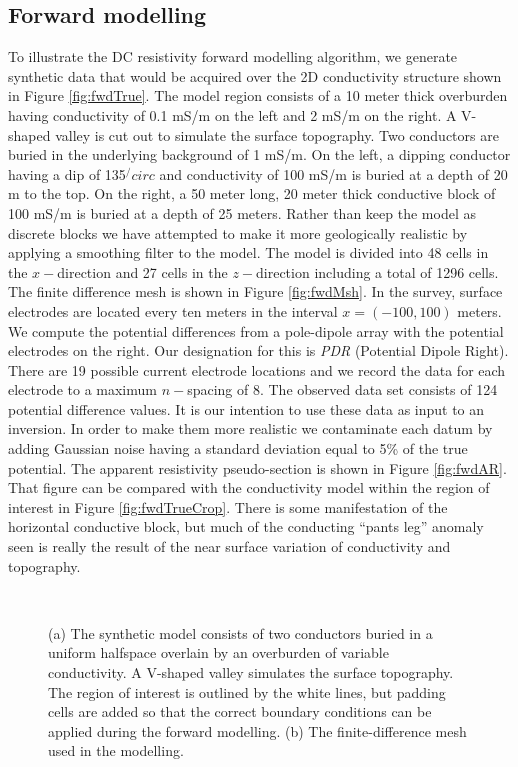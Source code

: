\subsection{Forward modelling}
To illustrate the DC resistivity forward modelling algorithm, we generate synthetic data that would be acquired over the 2D conductivity structure shown in Figure \ref{fig:fwdTrue}. The model region consists of a 10 meter thick overburden having conductivity of 0.1 mS/m on the left and 2 mS/m on the right. A V-shaped valley is cut out to simulate the surface topography. Two conductors are buried in the underlying background of 1 mS/m. On the left, a dipping conductor having a dip of 135$^/circ$ and conductivity of 100 mS/m is buried at a depth of 20 m to the top. On the right, a 50 meter long, 20 meter thick conductive block of 100 mS/m is buried at a depth of 25 meters. Rather than keep the model as discrete blocks we have attempted to make it more geologically realistic by applying a smoothing filter to the model. The model is divided into 48 cells in the $x-$direction and 27 cells in the $z-$direction including a total of 1296 cells. The finite difference mesh is shown in Figure \ref{fig:fwdMsh}. In the survey, surface electrodes are located every ten meters in the interval $x = (-100, 100)$ meters. We compute the potential differences from a pole-dipole array with the potential electrodes on the right. Our designation for this is \textit{PDR} (Potential Dipole Right). There are 19 possible current electrode locations and we record the data for each electrode to a maximum $n-$spacing of 8. The observed data set consists of 124 potential difference values. It is our intention to use these data as input to an inversion. In order to make them more realistic we contaminate each datum by adding Gaussian noise having a standard deviation equal to 5\% of the true potential. The apparent resistivity pseudo-section is shown in Figure \ref{fig:fwdAR}. That figure can be compared with the conductivity model within the region of interest in Figure \ref{fig:fwdTrueCrop}. There is some manifestation of the horizontal conductive block, but much of the conducting ``pants leg'' anomaly seen is really the result of the near surface variation of conductivity and topography. 
%
\begin{figure}
\centering
{} \\ 
\caption{(a) The synthetic model consists of two conductors buried in a uniform halfspace overlain by an overburden of variable conductivity. A V-shaped valley simulates the surface topography. The region of interest is outlined by the white lines, but padding cells are added so that the correct boundary conditions can be applied during the forward modelling. (b) The finite-difference mesh used in the modelling.}
\end{figure}
